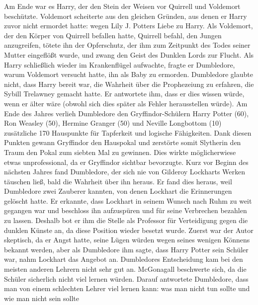 \documentclass[a4paper, 10pt]{article}
\begin{document}
\vspace{10pt}
\newline
{}  
Am Ende war es Harry, der den Stein der Weisen vor Quirrell und Voldemort beschützte. Voldemort scheiterte aus den gleichen Gründen, aus denen er Harry zuvor nicht ermordet hatte: wegen Lily J. Potters Liebe zu Harry. Als Voldemort, der den Körper von Quirrell befallen hatte, Quirrell befahl, den Jungen anzugreifen, tötete ihn der Opferschutz, der ihm zum Zeitpunkt des Todes seiner Mutter eingeflößt wurde, und zwang den Geist des Dunklen Lords zur Flucht. Als Harry schließlich wieder im Krankenflügel aufwachte, fragte er Dumbledore, warum Voldemort versucht hatte, ihn als Baby zu ermorden. Dumbledore glaubte nicht, dass Harry bereit war, die Wahrheit über die Prophezeiung zu erfahren, die Sybill Trelawney gemacht hatte. Er antwortete ihm, dass er dies wissen würde, wenn er älter wäre (obwohl sich dies später als Fehler herausstellen würde).
\vspace{10pt}
\newline
{}  
Am Ende des Jahres verlieh Dumbledore den Gryffindor-Schülern Harry Potter (60), Ron Weasley (50), Hermine Granger (50) und Neville Longbottom (10) zusätzliche 170 Hauspunkte für Tapferkeit und logische Fähigkeiten. Dank diesen Punkten gewann Gryffindor den Hauspokal und zerstörte somit Slytherin den Traum den Pokal zum siebten Mal zu gewinnen. Dies wirkte möglicherwiese etwas unprofessional, da er Gryffindor sichtbar bevorzugte.
\vspace{10pt}
\newline
{}  
Kurz vor Beginn des nächsten Jahres fand Dumbledore, der sich nie von Gilderoy Lockharts Werken täuschen ließ, bald die Wahrheit über ihn heraus. Er fand dies heraus, weil Dumbledore zwei Zauberer kannten, von denen Lockhart die Erinnerungen gelöscht hatte. Er erkannte, dass Lockhart in seinem Wunsch nach Ruhm zu weit gegangen war und beschloss ihn aufzuspüren und für seine Verbrechen bezahlen zu lassen. Deshalb bot er ihm die Stelle als Professor für Verteidigung gegen die dunklen Künste an, da diese Position wieder besetzt wurde. Zuerst war der Autor skeptisch, da er Angst hatte, seine Lügen würden wegen seines wenigen Könnens bekannt werden, aber als Dumbledore ihm sagte, dass Harry Potter sein Schüler war, nahm Lockhart das Angebot an.
\vspace{10pt}
\newline
{}  
Dumbledores Entscheidung kam bei den meisten anderen Lehrern nicht sehr gut an. McGonagall beschwerte sich, da die Schüler sicherlich nicht viel lernen würden. Darauf antwortete Dumbledore, dass man von einem schlechten Lehrer viel lernen kann: was man nicht tun sollte und wie man nicht sein sollte
\end{document}
